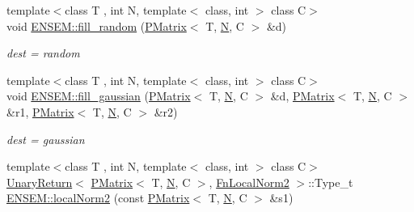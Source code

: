\begin{DoxyCompactItemize}
{\footnotesize template$<$class T , int N, template$<$ class, int $>$ class C$>$ }\\void \mbox{\hyperlink{group__primmatrix_gaa42f6f1f971a8fb7bf5b5b8b0a5a43ec}{E\+N\+S\+E\+M\+::fill\+\_\+random}} (\mbox{\hyperlink{classENSEM_1_1PMatrix}{P\+Matrix}}$<$ T, \mbox{\hyperlink{adat__devel_2lib_2hadron_2operator__name__util_8cc_a7722c8ecbb62d99aee7ce68b1752f337}{N}}, C $>$ \&d)
\begin{DoxyCompactList}\small\item\em dest = random \end{DoxyCompactList}\item 
{\footnotesize template$<$class T , int N, template$<$ class, int $>$ class C$>$ }\\void \mbox{\hyperlink{group__primmatrix_gaad23aac5e121c759d15b6153996bdf9e}{E\+N\+S\+E\+M\+::fill\+\_\+gaussian}} (\mbox{\hyperlink{classENSEM_1_1PMatrix}{P\+Matrix}}$<$ T, \mbox{\hyperlink{adat__devel_2lib_2hadron_2operator__name__util_8cc_a7722c8ecbb62d99aee7ce68b1752f337}{N}}, C $>$ \&d, \mbox{\hyperlink{classENSEM_1_1PMatrix}{P\+Matrix}}$<$ T, \mbox{\hyperlink{adat__devel_2lib_2hadron_2operator__name__util_8cc_a7722c8ecbb62d99aee7ce68b1752f337}{N}}, C $>$ \&r1, \mbox{\hyperlink{classENSEM_1_1PMatrix}{P\+Matrix}}$<$ T, \mbox{\hyperlink{adat__devel_2lib_2hadron_2operator__name__util_8cc_a7722c8ecbb62d99aee7ce68b1752f337}{N}}, C $>$ \&r2)
\begin{DoxyCompactList}\small\item\em dest = gaussian \end{DoxyCompactList}\item 
{\footnotesize template$<$class T , int N, template$<$ class, int $>$ class C$>$ }\\\mbox{\hyperlink{structENSEM_1_1UnaryReturn}{Unary\+Return}}$<$ \mbox{\hyperlink{classENSEM_1_1PMatrix}{P\+Matrix}}$<$ T, \mbox{\hyperlink{adat__devel_2lib_2hadron_2operator__name__util_8cc_a7722c8ecbb62d99aee7ce68b1752f337}{N}}, C $>$, \mbox{\hyperlink{structENSEM_1_1FnLocalNorm2}{Fn\+Local\+Norm2}} $>$\+::Type\+\_\+t \mbox{\hyperlink{group__primmatrix_ga701b80e6864ced6a31a2abc314946f2f}{E\+N\+S\+E\+M\+::local\+Norm2}} (const \mbox{\hyperlink{classENSEM_1_1PMatrix}{P\+Matrix}}$<$ T, \mbox{\hyperlink{adat__devel_2lib_2hadron_2operator__name__util_8cc_a7722c8ecbb62d99aee7ce68b1752f337}{N}}, C $>$ \&s1)
\item 

\end{DoxyCompactItemize}
